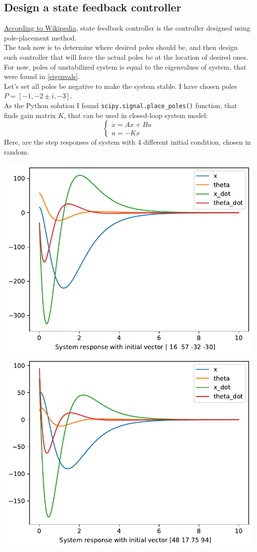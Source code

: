 \documentclass[a4paper,12pt]{article}
\begin{document}
    \subsection{Design a state feedback controller}
    \href{https://en.wikipedia.org/wiki/Full_state_feedback}{According to Wikipedia},
    state feedback controller is the controller designed using pole-placement
    method.\\
    The task now is to determine where desired poles should be, and then 
    design such controller that will force the actual poles be at the location 
    of desired ones.\\
    For now, poles of unstabilized system is equal to the eigenvalues of system,
    that were found in \ref{eigenvals}.\\
    Let's set all poles be negative to make the system stable.
    I have chosen poles $P = [-1, -2\pm i, -3]$.\\
    As the Python solution I found \texttt{scipy.signal.place\_poles()} function,
    that finds gain matrix $K$, that can be used in closed-loop system model:
    \begin{equation}
        \begin{cases}
            \dot x = Ax + Bu\\
            u = -Kx
        \end{cases}
    \end{equation}
    Here, are the step responses of system with 4 different initial condition, 
    chosen in random.
    \begin{center}
        \includegraphics[width=0.49\linewidth]{../Task2/Fig1.pdf}
        \includegraphics[width=0.49\linewidth]{../Task2/Fig2.pdf}
    \end{center}
\end{document}
